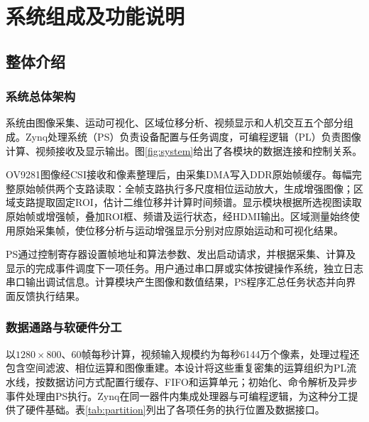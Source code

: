 \section{系统组成及功能说明}
\label{sec:methods}

\subsection{整体介绍}
\subsubsection{系统总体架构}
系统由图像采集、运动可视化、区域位移分析、视频显示和人机交互五个部分组成。Zynq处理系统（PS）负责设备配置与任务调度，可编程逻辑（PL）负责图像计算、视频接收及显示输出。图\ref{fig:system}给出了各模块的数据连接和控制关系。


OV9281图像经CSI接收和像素整理后，由采集DMA写入DDR原始帧缓存。每幅完整原始帧供两个支路读取：全帧支路执行多尺度相位运动放大，生成增强图像；区域支路提取固定ROI，估计二维位移并计算时间频谱。显示模块根据所选视图读取原始帧或增强帧，叠加ROI框、频谱及运行状态，经HDMI输出。区域测量始终使用原始采集帧，使位移分析与运动增强显示分别对应原始运动和可视化结果。

PS通过控制寄存器设置帧地址和算法参数、发出启动请求，并根据采集、计算及显示的完成事件调度下一项任务。用户通过串口屏或实体按键操作系统，独立日志串口输出调试信息。计算模块产生图像和数值结果，PS程序汇总任务状态并向界面反馈执行结果。

\subsubsection{数据通路与软硬件分工}
以$1280\times800$、60帧每秒计算，视频输入规模约为每秒6144万个像素，处理过程还包含空间滤波、相位运算和图像重建。本设计将这些重复密集的运算组织为PL流水线，按数据访问方式配置行缓存、FIFO和运算单元；初始化、命令解析及异步事件处理由PS执行。Zynq在同一器件内集成处理器与可编程逻辑，为这种分工提供了硬件基础\cite{ug585}。表\ref{tab:partition}列出了各项任务的执行位置及数据接口。

